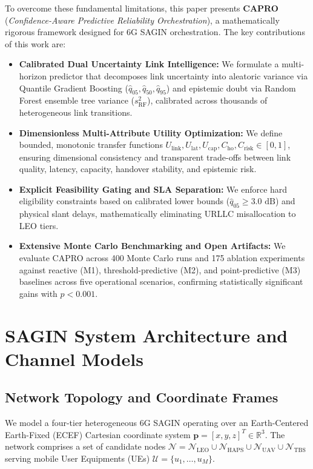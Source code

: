 \documentclass[conference]{IEEEtran}
\begin{document}
To overcome these fundamental limitations, this paper presents \textbf{CAPRO} (\textit{Confidence-Aware Predictive Reliability Orchestration}), a mathematically rigorous framework designed for 6G SAGIN orchestration. The key contributions of this work are:
\begin{itemize}
    \item \textbf{Calibrated Dual Uncertainty Link Intelligence:} We formulate a multi-horizon predictor that decomposes link uncertainty into aleatoric variance via Quantile Gradient Boosting ($\hat{q}_{05}, \hat{q}_{50}, \hat{q}_{95}$) and epistemic doubt via Random Forest ensemble tree variance ($s_{\text{RF}}^2$), calibrated across thousands of heterogeneous link transitions.
    \item \textbf{Dimensionless Multi-Attribute Utility Optimization:} We define bounded, monotonic transfer functions $U_{\text{link}}, U_{\text{lat}}, U_{\text{cap}}, C_{\text{ho}}, C_{\text{risk}} \in [0, 1]$, ensuring dimensional consistency and transparent trade-offs between link quality, latency, capacity, handover stability, and epistemic risk.
    \item \textbf{Explicit Feasibility Gating and SLA Separation:} We enforce hard eligibility constraints based on calibrated lower bounds ($\hat{q}_{05} \ge 3.0\text{ dB}$) and physical slant delays, mathematically eliminating URLLC misallocation to LEO tiers.
    \item \textbf{Extensive Monte Carlo Benchmarking and Open Artifacts:} We evaluate CAPRO across 400 Monte Carlo runs and 175 ablation experiments against reactive (M1), threshold-predictive (M2), and point-predictive (M3) baselines across five operational scenarios, confirming statistically significant gains with $p < 0.001$.
\end{itemize}

\section{SAGIN System Architecture and Channel Models}
\label{sec:system_model}

\subsection{Network Topology and Coordinate Frames}
We model a four-tier heterogeneous 6G SAGIN operating over an Earth-Centered Earth-Fixed (ECEF) Cartesian coordinate system $\mathbf{p} = [x, y, z]^T \in \mathbb{R}^3$. The network comprises a set of candidate nodes $\mathcal{N} = \mathcal{N}_{\text{LEO}} \cup \mathcal{N}_{\text{HAPS}} \cup \mathcal{N}_{\text{UAV}} \cup \mathcal{N}_{\text{TBS}}$ serving mobile User Equipments (UEs) $\mathcal{U} = \{u_1, \dots, u_M\}$.
\end{document}
